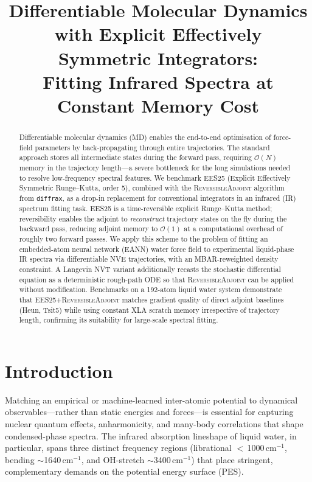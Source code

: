 \documentclass{article}
\title{%
  Differentiable Molecular Dynamics with Explicit Effectively Symmetric Integrators:\\
  Fitting Infrared Spectra at Constant Memory Cost%
}
\newcommand{\EES}{\textsc{EES25}}
\newcommand{\RevAdj}{\textsc{ReversibleAdjoint}}
\newcommand{\diffrax}{\texttt{diffrax}}
\newcommand{\EANN}{\textsc{EANN}}
\newcommand{\MBAR}{\textsc{MBAR}}
\begin{document}
\maketitle

\begin{abstract}
Differentiable molecular dynamics (MD) enables the end-to-end optimisation of
force-field parameters by back-propagating through entire trajectories.  The
standard approach stores all intermediate states during the forward pass,
requiring $\mathcal{O}(N)$ memory in the trajectory length---a severe bottleneck
for the long simulations needed to resolve low-frequency spectral features.
We benchmark \EES{} (Explicit Effectively Symmetric Runge--Kutta, order 5),
combined with the \RevAdj{} algorithm from \diffrax, as a drop-in replacement
for conventional integrators in an infrared (IR) spectrum fitting task.
\EES{} is a time-reversible explicit Runge--Kutta method; reversibility
enables the adjoint to \emph{reconstruct} trajectory states on the fly during
the backward pass, reducing adjoint memory to $\mathcal{O}(1)$ at a
computational overhead of roughly two forward passes.
We apply this scheme to the problem of fitting an embedded-atom neural network
(\EANN) water force field to experimental liquid-phase IR spectra via
differentiable NVE trajectories, with an \MBAR{}-reweighted density
constraint.  A Langevin NVT variant additionally recasts the stochastic
differential equation as a deterministic rough-path ODE so that
\RevAdj{} can be applied without modification.
Benchmarks on a 192-atom liquid water system demonstrate that
\EES{}+\RevAdj{} matches gradient quality of direct adjoint baselines
(Heun, Tsit5) while using constant XLA scratch memory irrespective of
trajectory length, confirming its suitability for large-scale spectral
fitting.
\end{abstract}

\section{Introduction}
\label{sec:intro}

Matching an empirical or machine-learned inter-atomic potential to dynamical
observables---rather than static energies and forces---is essential for
capturing nuclear quantum effects, anharmonicity, and many-body correlations
that shape condensed-phase spectra.  The infrared absorption lineshape of
liquid water, in particular, spans three distinct frequency regions (librational
$<$\,1000\,cm$^{-1}$, bending $\sim$1640\,cm$^{-1}$, and OH-stretch
$\sim$3400\,cm$^{-1}$) that place stringent, complementary demands on the
potential energy surface (PES).
\end{document}
